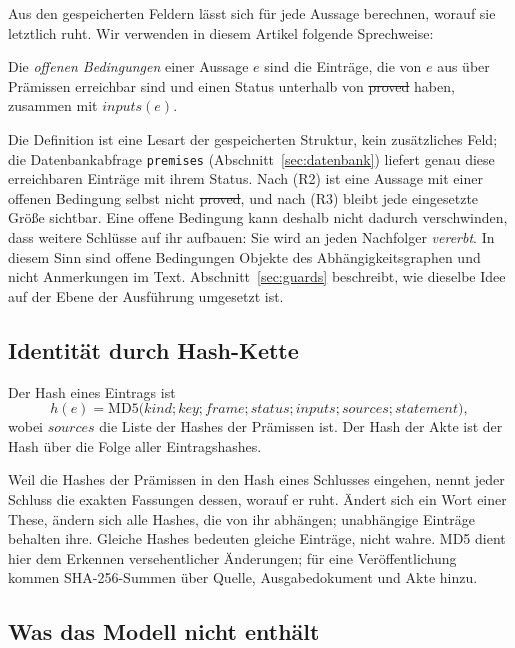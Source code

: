 Aus den gespeicherten Feldern lässt sich für jede Aussage berechnen, worauf sie letztlich ruht. Wir verwenden in diesem Artikel folgende
Sprechweise:

\begin{definition}\label{def:offen}
Die \emph{offenen Bedingungen} einer Aussage \(e\) sind die Einträge, die von \(e\) aus über Prämissen erreichbar sind und einen Status
unterhalb von \st{proved} haben, zusammen mit \(\mathit{inputs}(e)\).
\end{definition}

Die Definition ist eine Lesart der gespeicherten Struktur, kein zusätzliches Feld; die Datenbankabfrage \texttt{premises}
(Abschnitt~\ref{sec:datenbank}) liefert genau diese erreichbaren Einträge mit ihrem Status. Nach (R2) ist eine Aussage mit einer offenen
Bedingung selbst nicht \st{proved}, und nach (R3) bleibt jede eingesetzte Größe sichtbar. Eine offene Bedingung kann deshalb nicht dadurch
verschwinden, dass weitere Schlüsse auf ihr aufbauen: Sie wird an jeden Nachfolger \emph{vererbt}. In diesem Sinn sind offene
Bedingungen Objekte des Abhängigkeitsgraphen und nicht Anmerkungen im Text. Abschnitt~\ref{sec:guards} beschreibt, wie dieselbe Idee
auf der Ebene der Ausführung umgesetzt ist.

\subsection{Identität durch Hash-Kette}

\begin{definition}
Der Hash eines Eintrags ist
\[
h(e)=\mathrm{MD5}\bigl(\mathit{kind};\mathit{key};\mathit{frame};\mathit{status};\mathit{inputs};\mathit{sources};\mathit{statement}\bigr),
\]
wobei \(\mathit{sources}\) die Liste der Hashes der Prämissen ist. Der Hash der Akte ist der Hash über die Folge aller Eintragshashes.
\end{definition}

Weil die Hashes der Prämissen in den Hash eines Schlusses eingehen, nennt jeder Schluss die exakten Fassungen dessen, worauf er ruht.
Ändert sich ein Wort einer These, ändern sich alle Hashes, die von ihr abhängen; unabhängige Einträge behalten ihre. Gleiche Hashes
bedeuten gleiche Einträge, nicht wahre. MD5 dient hier dem Erkennen versehentlicher Änderungen; für eine Veröffentlichung kommen
SHA-256-Summen über Quelle, Ausgabedokument und Akte hinzu.

\subsection{Was das Modell nicht enthält}

